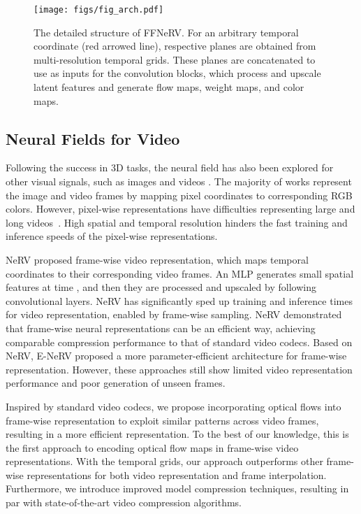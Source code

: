 \documentclass[sigconf]{acmart}
\begin{document}
\begin{figure*}[t]
\begin{center}
\texttt{[image: figs/fig\_arch.pdf]}
\end{center}
   \caption{The detailed structure of FFNeRV. For an arbitrary temporal coordinate (red arrowed line), respective planes are obtained from multi-resolution temporal grids. These planes are concatenated to use as inputs for the convolution blocks, which process and upscale latent features and generate flow maps, weight maps, and color maps.}
\label{fig_arch}
\end{figure*}

\subsection{Neural Fields for Video}
Following the success in 3D tasks, the neural field has also been explored for other visual signals, such as images \cite{coin, img_comp, liif} and videos \cite{videoinr, video_cohen, video_rho, scalable}.
The majority of works represent the image and video frames by mapping pixel coordinates to corresponding RGB colors.
However, pixel-wise representations have difficulties representing large and long videos~\cite{nerv}. High spatial and temporal resolution hinders the fast training and inference speeds of the pixel-wise representations.

NeRV \cite{nerv} proposed frame-wise video representation, which maps temporal coordinates to their corresponding video frames.
An MLP generates small spatial features at time , and then they are processed and upscaled by following convolutional layers.
NeRV has significantly sped up training and inference times for video representation, enabled by frame-wise sampling.
NeRV demonstrated that frame-wise neural representations can be an efficient way, achieving comparable compression performance to that of standard video codecs.
Based on NeRV, E-NeRV \cite{enerv} proposed a more parameter-efficient architecture for frame-wise representation.
However, these approaches still show limited video representation performance and poor generation of unseen frames.

Inspired by standard video codecs, we propose incorporating optical flows into frame-wise representation to exploit similar patterns across video frames, resulting in a more efficient representation.
To the best of our knowledge, this is the first approach to encoding optical flow maps in frame-wise video representations.
With the temporal grids, our approach outperforms other frame-wise representations for both video representation and frame interpolation.
Furthermore, we introduce improved model compression techniques, resulting in par with state-of-the-art video compression algorithms.
\end{document}

